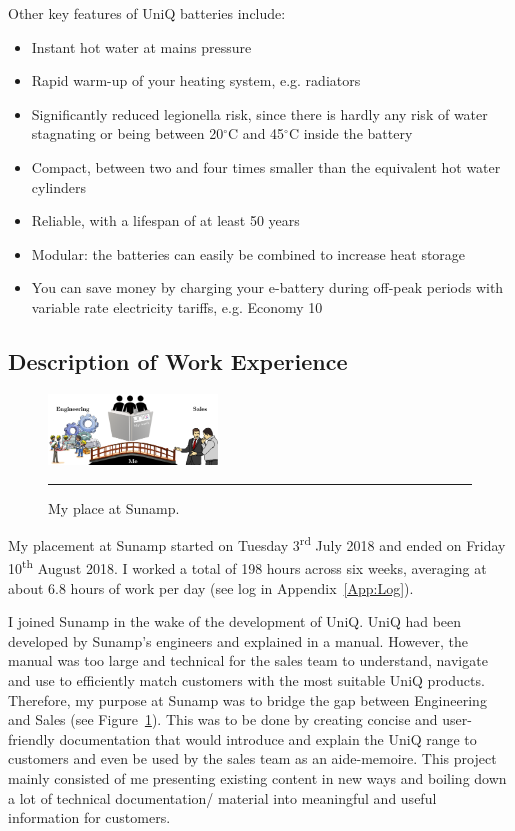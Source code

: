 Other key features of UniQ batteries include:
\begin{itemize}
	\item Instant hot water at mains pressure
	\item Rapid warm-up of your heating system, e.g. radiators
	\item Significantly reduced legionella risk, since there is hardly any risk of water stagnating or being between 20$^{\circ}$C and 45$^{\circ}$C inside the battery \citep{HSE_legionella}
	\item Compact, between two and four times smaller than the equivalent hot water cylinders
	\item Reliable, with a lifespan of at least 50 years
	\item Modular: the batteries can easily be combined to increase heat storage
	\item You can save money by charging your e-battery during off-peak periods with variable rate electricity tariffs, e.g. Economy 10
\end{itemize}




\subsection*{Description of Work Experience}

\begin{figure}
	\includegraphics[width=0.4\textwidth]{figures/bridge.png}
	\rule{0.4\textwidth}{0.5pt} %
	\caption{My place at Sunamp.}
	\label{fig:bridge}
\end{figure}

My placement at Sunamp started on Tuesday 3\textsuperscript{rd} July 2018 and ended on Friday 10\textsuperscript{th} August 2018.
I worked a total of 198 hours across six weeks, averaging at about 6.8 hours of work per day (see log in Appendix~\ref{App:Log}).

I joined Sunamp in the wake of the development of UniQ.
UniQ had been developed by Sunamp's engineers and explained in a manual.
However, the manual was too large and technical for the sales team to understand, navigate and use to efficiently match customers with the most suitable UniQ products.
Therefore, my purpose at Sunamp was to bridge the gap between Engineering and Sales (see Figure~\ref{fig:bridge}).
This was to be done by creating concise and user-friendly documentation that would introduce and explain the UniQ range to customers and even be used by the sales team as an aide-memoire.
This project mainly consisted of me presenting existing content in new ways and boiling down a lot of technical documentation/ material into meaningful and useful information for customers.

